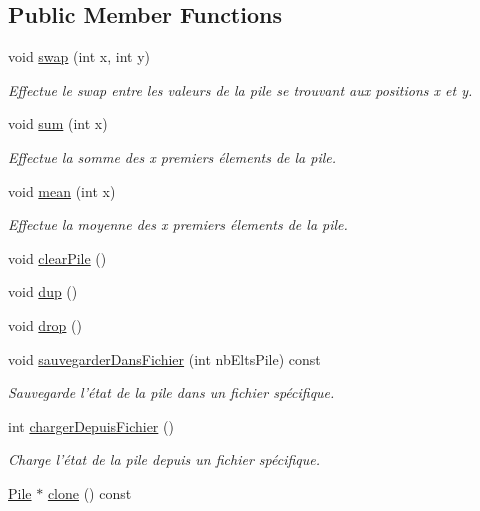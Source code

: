 \subsection*{\-Public \-Member \-Functions}
\begin{DoxyCompactItemize}
\item 
void \hyperlink{classPile_a1a19ce2a4a6a76286fae8243a1f9e247}{swap} (int x, int y)
\begin{DoxyCompactList}\small\item\em \-Effectue le swap entre les valeurs de la pile se trouvant aux positions x et y. \end{DoxyCompactList}\item 
void \hyperlink{classPile_ae09e2cf01c21b58a6c2c4efee101c158}{sum} (int x)
\begin{DoxyCompactList}\small\item\em \-Effectue la somme des x premiers élements de la pile. \end{DoxyCompactList}\item 
void \hyperlink{classPile_a1daebba5bd1d6c6d79de63728cc892a9}{mean} (int x)
\begin{DoxyCompactList}\small\item\em \-Effectue la moyenne des x premiers élements de la pile. \end{DoxyCompactList}\item 
void \hyperlink{classPile_a3bfd5edd27566980c978b9b9692dcac2}{clear\-Pile} ()
\item 
void \hyperlink{classPile_a081f7843d01cae1f0f7be7d92e46d5d2}{dup} ()
\item 
void \hyperlink{classPile_a7488ed257c6ceb16ed57a9fffb0726d5}{drop} ()
\item 
void \hyperlink{classPile_a70be33baaba88e35a7c7fb4203cd703c}{sauvegarder\-Dans\-Fichier} (int nb\-Elts\-Pile) const 
\begin{DoxyCompactList}\small\item\em \-Sauvegarde l'état de la pile dans un fichier spécifique. \end{DoxyCompactList}\item 
int \hyperlink{classPile_a5ec4b766e09cfd2fdf97b7c093609f9d}{charger\-Depuis\-Fichier} ()
\begin{DoxyCompactList}\small\item\em \-Charge l'état de la pile depuis un fichier spécifique. \end{DoxyCompactList}\item 
\hyperlink{classPile}{\-Pile} $\ast$ \hyperlink{classPile_ab5dfd21edb0870f3dc9d8ce0eaf63e65}{clone} () const 

\end{DoxyCompactItemize}
